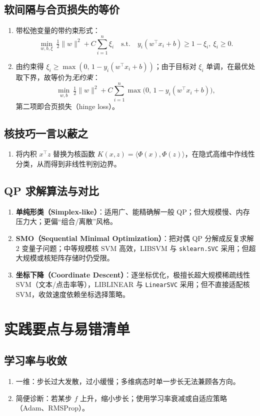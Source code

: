 \documentclass[10.5pt,hyperref,a4paper,UTF8]{ctexart}
\theoremstyle{definition}
\begin{document}
\subsection{软间隔与合页损失的等价}
\begin{enumerate}
  \item 带松弛变量的带约束形式：
  \[
  \min_{w,b,\xi}\ \tfrac12\lVert w\rVert^2 + C\sum_{i=1}^n \xi_i\quad
  \text{s.t.}\quad y_i(w^\top x_i+b)\ge 1-\xi_i,\ \xi_i\ge 0.
  \]
  \item 由约束得 $\xi_i\ge \max(0,\,1-y_i(w^\top x_i+b))$；由于目标对 $\xi_i$ 单调，在最优处取下界，故等价为\emph{无约束}：
  \[
  \min_{w,b}\ \tfrac12\lVert w\rVert^2+C\sum_{i=1}^n \max\bigl(0,\,1-y_i(w^\top x_i+b)\bigr),
  \]
  第二项即合页损失（hinge loss）。
\end{enumerate}

\subsection{核技巧一言以蔽之}
\begin{enumerate}
  \item 将内积 $x^\top z$ 替换为核函数 $K(x,z)=\langle \Phi(x),\Phi(z)\rangle$，在隐式高维中作线性分类，从而得到非线性判别边界。
\end{enumerate}

\subsection{QP 求解算法与对比}
\begin{enumerate}
  \item \textbf{单纯形类（Simplex-like）}：适用广、能精确解一般 QP；但大规模慢、内存压力大；更偏“组合/离散”风格。
  \item \textbf{SMO（Sequential Minimal Optimization）}：把对偶 QP 分解成反复求解 $2$ 变量子问题；中等规模核 SVM 高效，LIBSVM 与 \texttt{sklearn.SVC} 采用；但超大规模或核矩阵存储时仍受限。
  \item \textbf{坐标下降（Coordinate Descent）}：逐坐标优化，极擅长超大规模稀疏线性 SVM（文本/点击率等），LIBLINEAR 与 \texttt{LinearSVC} 采用；但不直接适配核 SVM，收敛速度依赖坐标选择策略。
\end{enumerate}

\section{实践要点与易错清单}

\subsection{学习率与收敛}
\begin{enumerate}
  \item 一维：步长过大发散，过小缓慢；多维病态时单一步长无法兼顾各方向。
  \item 简便诊断：若某步 $f$ 上升，缩小步长；使用学习率衰减或自适应策略（Adam、RMSProp）。
\end{enumerate}
\end{document}
